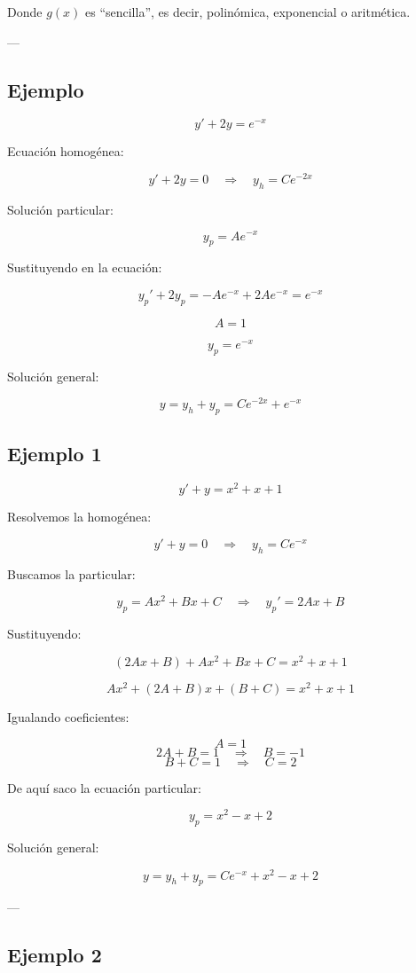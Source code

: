 \documentclass[a4paper,12pt]{article}
\begin{document}
Donde $g(x)$ es “sencilla”, es decir, polinómica, exponencial o aritmética.

---

\subsection*{Ejemplo}

\[
y' + 2y = e^{-x}
\]

Ecuación homogénea:

\[
y' + 2y = 0 \quad \Rightarrow \quad y_h = C e^{-2x}
\]

Solución particular:

\[
y_p = A e^{-x}
\]

Sustituyendo en la ecuación:

\[
y_p' + 2y_p = -A e^{-x} + 2A e^{-x} = e^{-x}
\]

\[
A = 1
\]

\[
y_p = e^{-x}
\]

Solución general:

\[
y = y_h + y_p = C e^{-2x} + e^{-x}
\]
\subsection*{Ejemplo 1}

\[
y' + y = x^2 + x + 1
\]

Resolvemos la homogénea:

\[
y' + y = 0 \quad \Rightarrow \quad y_h = C e^{-x}
\]

Buscamos la particular:

\[
y_p = Ax^2 + Bx + C \quad \Rightarrow \quad y_p' = 2Ax + B
\]

Sustituyendo:

\[
(2Ax + B) + A x^2 + Bx + C = x^2 + x + 1
\]

\[
A x^2 + (2A + B)x + (B + C) = x^2 + x + 1
\]

Igualando coeficientes:

\[
A = 1
\]
\[
2A + B = 1 \quad \Rightarrow \quad B = -1
\]
\[
B + C = 1 \quad \Rightarrow \quad C = 2
\]

De aquí saco la ecuación particular:

\[
y_p = x^2 - x + 2
\]

Solución general:

\[
y = y_h + y_p = C e^{-x} + x^2 - x + 2
\]

---

\subsection*{Ejemplo 2}
\end{document}
